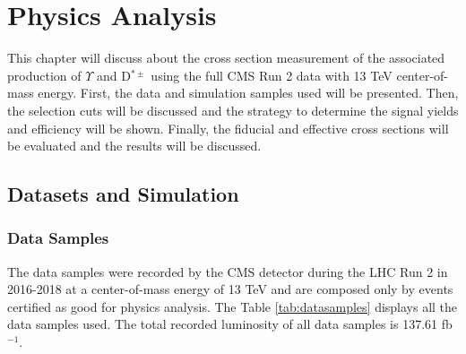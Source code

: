 \chapter{Physics Analysis}

This chapter will discuss about the cross section measurement of the associated production of $\Upsilon$ and D$^{*\pm}$ using the full CMS Run 2 data with 13 TeV center-of-mass energy. First, the data and simulation samples used will be presented. Then, the selection cuts will be discussed and the strategy to determine the signal yields and efficiency will be shown. Finally, the fiducial and effective cross sections will be evaluated and the results will be discussed.

\section{Datasets and Simulation}
\subsection{Data Samples}

The data samples were recorded by the CMS detector during the LHC Run 2 in 2016-2018 at a center-of-mass energy of 13 TeV and are composed only by events certified as good for physics analysis. The Table \ref{tab:datasamples} displays all the data samples used. The total recorded luminosity of all data samples is 137.61 fb$^{-1}$.

